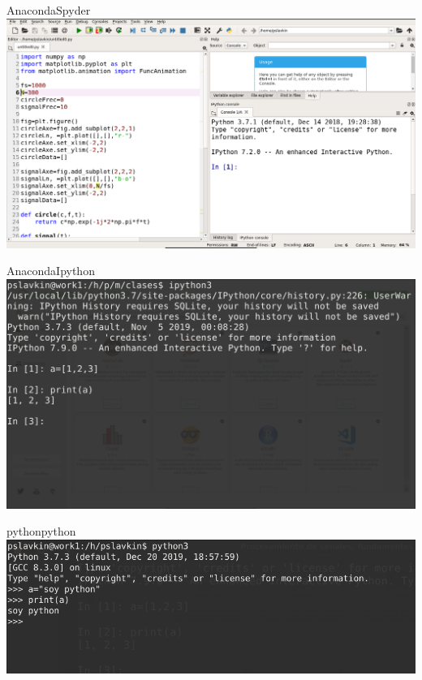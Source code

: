  \begin{frame}{Anaconda}{Spyder}
       \center\includegraphics[width=1\textwidth]{python/spyder}
    \vfill
 \end{frame}
 \begin{frame}{Anaconda}{Ipython}
       \center\includegraphics[width=1\textwidth]{python/ipython}
    \vfill
 \end{frame}
 \begin{frame}{python}{python}
       \center\includegraphics[width=1\textwidth]{python/python3}
    \vfill
 \end{frame}

